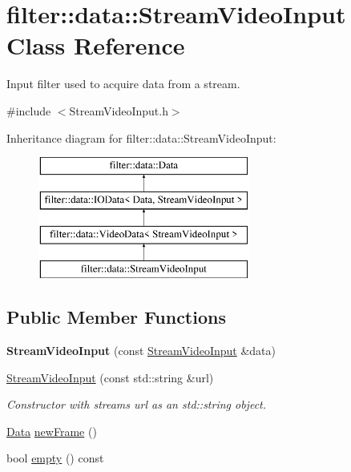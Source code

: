\hypertarget{classfilter_1_1data_1_1_stream_video_input}{}\section{filter\+:\+:data\+:\+:Stream\+Video\+Input Class Reference}
\label{classfilter_1_1data_1_1_stream_video_input}


Input filter used to acquire data from a stream.  




{\ttfamily \#include $<$Stream\+Video\+Input.\+h$>$}

Inheritance diagram for filter\+:\+:data\+:\+:Stream\+Video\+Input\+:\begin{figure}[H]
\begin{center}
\leavevmode
\includegraphics[height=4.000000cm]{d3/d42/classfilter_1_1data_1_1_stream_video_input}
\end{center}
\end{figure}
\subsection*{Public Member Functions}
\begin{DoxyCompactItemize}
\item 
\mbox{\label{classfilter_1_1data_1_1_stream_video_input_a720d5b86a872e66c0a69a1948cde0189}} 
{\bfseries Stream\+Video\+Input} (const \hyperlink{classfilter_1_1data_1_1_stream_video_input}{Stream\+Video\+Input} \&data)
\item 
\hyperlink{classfilter_1_1data_1_1_stream_video_input_a5e3d671ab429874556b35a5a696aa390}{Stream\+Video\+Input} (const std\+::string \&url)
\begin{DoxyCompactList}\small\item\em Constructor with stream\textquotesingle{}s url as an std\+::string object. \end{DoxyCompactList}\item 
\hyperlink{classfilter_1_1data_1_1_data}{Data} \hyperlink{classfilter_1_1data_1_1_stream_video_input_af2a6fc1d8d1f809684e11d156dfc8e7d}{new\+Frame} ()
\item 
bool \hyperlink{classfilter_1_1data_1_1_stream_video_input_ab0b4745731df53d3be6dfed959be5b7b}{empty} () const
\end{DoxyCompactItemize}

